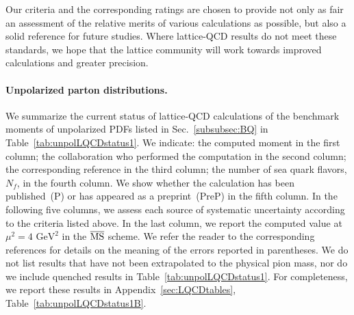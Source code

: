 Our criteria and the corresponding ratings are chosen to provide not only as 
fair an assessment of the relative merits of various calculations as possible, 
but also a solid reference for future studies.
%
Where lattice-QCD results do not meet these standards, we hope that the lattice 
community will work towards improved calculations and greater precision.

\paragraph{Unpolarized parton distributions.}
We summarize the current status of lattice-QCD calculations of the benchmark 
moments of unpolarized PDFs listed in Sec.~\ref{subsubsec:BQ} in 
Table~\ref{tab:unpolLQCDstatus1}. 
%
We indicate: the computed moment in the first column; the collaboration who
performed the computation in the second column; the corresponding reference
in the third column; the number of sea quark flavors, $N_f$, in the fourth 
column.
%
We show whether the calculation has been published~(P) 
or has appeared as a preprint~(PreP) in the fifth column.
%
In the following five columns, we assess each source of systematic uncertainty
according to the criteria listed above. 
%
In the last column, we report the computed value at $\mu^2=4\mbox{ GeV}^2$
in the $\overline{{\rm MS}}$ scheme.
%
We refer the reader to the corresponding references for details on the 
meaning of the errors reported in parentheses.
%
We do not list results that have not been extrapolated to the physical pion 
mass, nor do we include quenched results in Table~\ref{tab:unpolLQCDstatus1}. 
%
For completeness, we report these results in  Appendix~\ref{sec:LQCDtables},
Table~\ref{tab:unpolLQCDstatus1B}.

